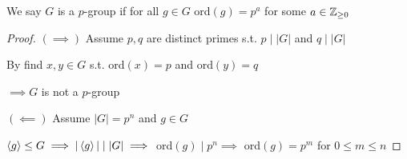 \begin{definition}
    We say $G$ is a $p$-group if for all $g\in G$
    ord$(g)=p^a$ for some $a\in\mathbb{Z}_{\geq0}$
\end{definition}
\newpage
{}

\begin{proof}
    \phantom{text}

    $(\implies)$ Assume $p,q$ are distinct primes s.t. $p \mid |G|$
    and $q \mid |G|$

    By  find $x,y \in G$
    s.t. ord$(x)$$=p$ and ord$(y)=q$

    $\implies G$ is not a $p$-group

    $(\impliedby)$ Assume $|G|=p^n$ and $g \in G$

    $\left\langle g \right\rangle\leq G \implies |\left\langle g \right\rangle| \mid |G| \implies$ 
    ord$(g) \mid p^n \implies$ ord$(g)=p^m$ for $0\leq m \leq n$
\end{proof}


